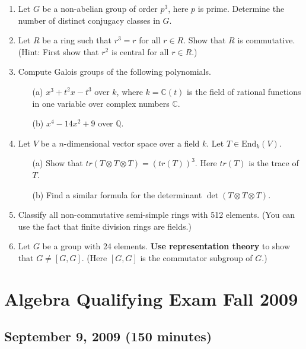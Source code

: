 \documentclass{article}
\begin{document}
\begin{enumerate}
    \item Let \(G\) be a non-abelian group of order \(p^3\), here \(p\) is prime. Determine the number of distinct conjugacy classes in \(G\).

    \item Let \(R\) be a ring such that \(r^3 = r\) for all \(r \in R\). Show that \(R\) is commutative. (Hint: First show that \(r^2\) is central for all \(r \in R\).)

    \item Compute Galois groups of the following polynomials.
    \begin{itemize}
        \item[(a)] \(x^3 + t^2x - t^3\) over \(k\), where \(k = \mathbb{C}(t)\) is the field of rational functions in one variable over complex numbers \(\mathbb{C}\).
        \item[(b)] \(x^4 - 14x^2 + 9\) over \(\mathbb{Q}\).
    \end{itemize}

    \item Let \(V\) be a \(n\)-dimensional vector space over a field \(k\). Let \(T \in \text{End}_k(V)\).
    \begin{itemize}
        \item[(a)] Show that \(tr(T \otimes T \otimes T) = (tr(T))^3\). Here \(tr(T)\) is the trace of \(T\).
        \item[(b)] Find a similar formula for the determinant \(\det(T \otimes T \otimes T)\).
    \end{itemize}

    \item Classify all non-commutative semi-simple rings with 512 elements. (You can use the fact that finite division rings are fields.)

    \item Let \(G\) be a group with 24 elements. \textbf{Use representation theory} to show that \(G \neq [G, G]\). (Here \([G, G]\) is the commutator subgroup of \(G\).)
\end{enumerate}

\section*{Algebra Qualifying Exam Fall 2009}
\subsection*{September 9, 2009 (150 minutes)}
\end{document}
